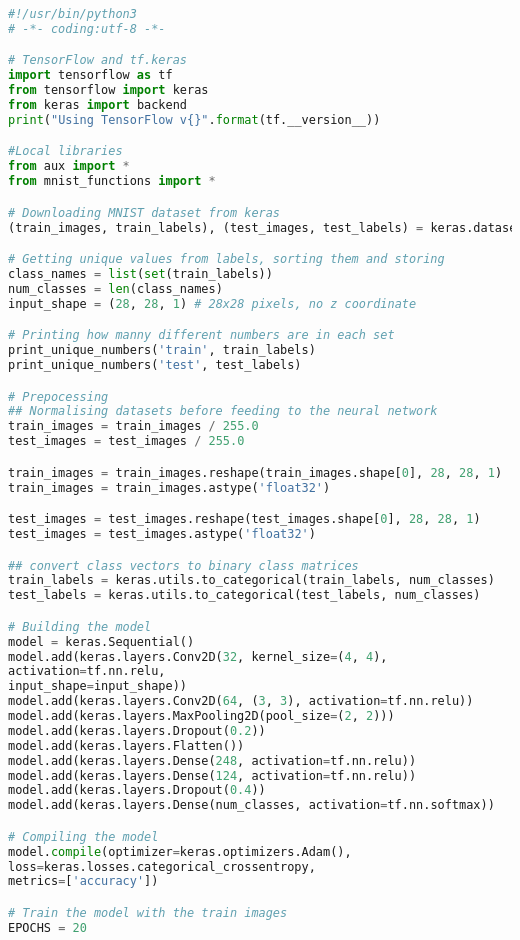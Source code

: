 \begin{lstlisting}[language=python]
#!/usr/bin/python3
# -*- coding:utf-8 -*-

# TensorFlow and tf.keras
import tensorflow as tf
from tensorflow import keras
from keras import backend
print("Using TensorFlow v{}".format(tf.__version__))

#Local libraries
from aux import *
from mnist_functions import *

# Downloading MNIST dataset from keras
(train_images, train_labels), (test_images, test_labels) = keras.datasets.mnist.load_data()

# Getting unique values from labels, sorting them and storing
class_names = list(set(train_labels))
num_classes = len(class_names)
input_shape = (28, 28, 1) # 28x28 pixels, no z coordinate

# Printing how manny different numbers are in each set
print_unique_numbers('train', train_labels)
print_unique_numbers('test', test_labels)

# Prepocessing
## Normalising datasets before feeding to the neural network
train_images = train_images / 255.0
test_images = test_images / 255.0

train_images = train_images.reshape(train_images.shape[0], 28, 28, 1)
train_images = train_images.astype('float32')

test_images = test_images.reshape(test_images.shape[0], 28, 28, 1)
test_images = test_images.astype('float32')

## convert class vectors to binary class matrices
train_labels = keras.utils.to_categorical(train_labels, num_classes)
test_labels = keras.utils.to_categorical(test_labels, num_classes)

# Building the model
model = keras.Sequential()
model.add(keras.layers.Conv2D(32, kernel_size=(4, 4),
activation=tf.nn.relu,
input_shape=input_shape))
model.add(keras.layers.Conv2D(64, (3, 3), activation=tf.nn.relu))
model.add(keras.layers.MaxPooling2D(pool_size=(2, 2)))
model.add(keras.layers.Dropout(0.2))
model.add(keras.layers.Flatten())
model.add(keras.layers.Dense(248, activation=tf.nn.relu))
model.add(keras.layers.Dense(124, activation=tf.nn.relu))
model.add(keras.layers.Dropout(0.4))
model.add(keras.layers.Dense(num_classes, activation=tf.nn.softmax))

# Compiling the model
model.compile(optimizer=keras.optimizers.Adam(),
loss=keras.losses.categorical_crossentropy,
metrics=['accuracy'])

# Train the model with the train images
EPOCHS = 20


\end{lstlisting}

